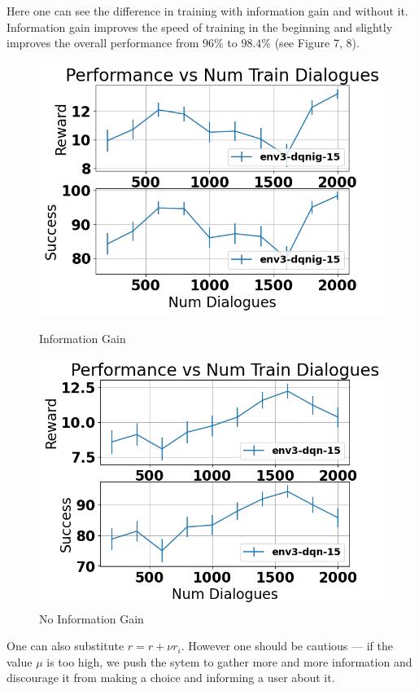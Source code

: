 \documentclass[12pt,titlepage,a4paper]{article}
\begin{document}
Here one can see the difference in training with information gain and without it. Information gain improves the speed of training in the beginning and slightly improves the overall performance from $96\%$  to $98.4\%$ (see Figure 7, 8).

\begin{figure}[!htb]
      \includegraphics[width=\linewidth]{env3-ig-CamRestaurants.png}
      \caption{Information Gain}
    \endminipage\hfill
      \includegraphics[width=\linewidth]{env3-CamRestaurants.png}
      \caption{No Information Gain}
    \endminipage
\end{figure}

One can also substitute $r = r + \nu r_i$. However one should be cautious --- if the value $\mu$ is too high, we push the sytem to gather more and more information and discourage it from making a choice and informing a user about it. 
\end{document}
